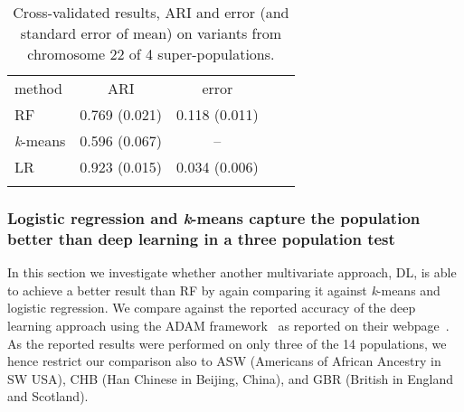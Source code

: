 \documentclass{llncs}
\newcommand{\kMeans}{\textit{k}-means }
\begin{document}
{\begin{table}
\caption{Cross-validated results, ARI and error (and standard error of mean) on variants from chromosome 22 of 4 super-populations.}
\begin{center}
\renewcommand{\arraystretch}{1.4}
\setlength\tabcolsep{3pt}
\begin{tabular}{lcccc}
\hline\noalign{\smallskip}
method  & ARI & error \\
RF  & 0.769 (0.021) &0.118 (0.011) \\
\kMeans & 0.596 (0.067) & -- \\
LR & 0.923 (0.015) & 0.034 (0.006) \\
\noalign{\smallskip}
\hline
\label{RF}
\end{tabular}
\end{center}
\end{table}


\subsubsection{Logistic regression and \kMeans{} capture the population better than deep learning in a three population test}
In this section we investigate whether another multivariate approach, DL, is able to achieve a better result than
RF by again comparing it against \kMeans{} and logistic regression.  We compare against the reported accuracy of the
deep learning approach using the {\sc ADAM} framework~\cite{Massie2013} as reported on their webpage~\cite{Ferguson}.
As the reported results were performed on only three of the 14 populations, we hence restrict our comparison also to ASW
(Americans of African Ancestry in SW USA), CHB (Han Chinese in Beijing, China), and GBR (British in England and
Scotland).

}
\end{document}
